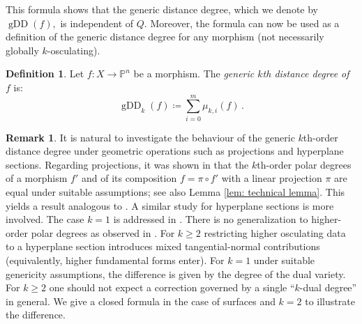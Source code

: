 \documentclass[11pt,reqno]{amsart}
\numberwithin{equation}{section}
\theoremstyle{plain}
\numberwithin{theorem}{section}
\theoremstyle{definition}
\newtheorem{definition}[theorem]{Definition}
\newtheorem{remark}[theorem]{Remark}
\renewcommand{\P}{\mathbb{P}}
\newcommand{\gDD}{\operatorname{gDD}}
\begin{document}
This formula shows that the generic distance degree, which we denote by $\gDD(f),$ is independent of $Q$. Moreover, the formula can now be used as a definition of the generic distance degree for any morphism (not necessarily globally $k$-osculating).

\begin{definition}\label{def:generic DD}
Let $f\colon X\to \P^n$ be a morphism. The {\em generic $k$th distance degree of $f$} is:
\[
\gDD_k(f)\coloneqq\sum_{i=0}^m \mu_{k,i}(f)\,.
\]
\end{definition}

\begin{remark}\label{rem: hyperplane_k2}
It is natural to investigate the behaviour of the generic $k$th-order distance degree under geometric operations such as projections and hyperplane sections. Regarding projections, it was shown in \cite[Proposition~3.2]{piene2022higher} that the $k$th-order polar degrees of a morphism $f'$ and of its composition $f=\pi\circ f'$ with a linear projection $\pi$ are equal under suitable assumptions; see also Lemma \ref{lem: technical lemma}. This yields a result analogous to \cite[Corollary~6.1]{DHOST}.
A similar study for hyperplane sections is more involved. The case $k=1$ is addressed in \cite[Theorem~4.1]{piene1978polar}. There is no generalization to higher-order polar degrees as observed in \cite[Section 3]{piene2022higher}. For $k\ge 2$ restricting higher osculating data to a hyperplane section introduces mixed tangential-normal contributions (equivalently, higher fundamental forms enter). For $k=1$ under suitable genericity assumptions, the difference is given by the degree of the dual variety. For $k\geq 2$ one should not expect a correction governed by a single ``$k$-dual degree'' in general.
We give a closed formula in the case of surfaces and $k=2$ to illustrate the difference.


\end{remark}
\end{document}
